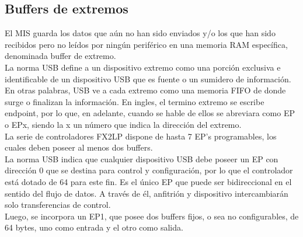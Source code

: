 \subsection{Buffers de extremos}
	El MIS guarda los datos que aún no han sido enviados y/o los que han sido recibidos pero no leídos por ningún periférico en una memoria RAM específica, denominada buffer de extremo.\\
	
	La norma USB define a un dispositivo extremo como una porción exclusiva e identificable de un dispositivo USB que es fuente o un sumidero de información. En otras palabras, USB ve a cada extremo como una memoria FIFO de donde surge o finalizan la información. En ingles, el termino extremo se escribe endpoint, por lo que, en adelante, cuando se hable de ellos se abreviara como EP o EPx, siendo la x un número que indica la dirección del extremo.\\
	
	La serie de controladores FX2LP dispone de hasta 7 EP's programables, los cuales deben poseer al menos dos buffers.\\
	
	La norma USB indica que cualquier dispositivo USB debe poseer un EP con dirección 0 que se destina para control y configuración, por lo que el controlador está dotado de \SI{64}{\byte} para este fin. Es el único EP que puede ser bidireccional en el sentido del flujo de datos. A través de él, anfitrión y dispositivo intercambiarán solo transferencias de control.\\
	
	Luego, se incorpora un EP1, que posee dos buffers fijos, o sea no configurables, de 64 bytes, uno como entrada y el otro como salida.\\
	
